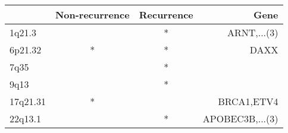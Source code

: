 \begin{tabular}{lccr}
\toprule
{} & Non-recurrence & Recurrence &             Gene \\
\midrule
1q21.3   &                &          * &      ARNT,...(3) \\
6p21.32  &              * &          * &             DAXX \\
7q35     &                &          * &                  \\
9q13     &                &          * &                  \\
17q21.31 &              * &            &       BRCA1,ETV4 \\
22q13.1  &                &          * &  APOBEC3B,...(3) \\
\bottomrule
\end{tabular}
